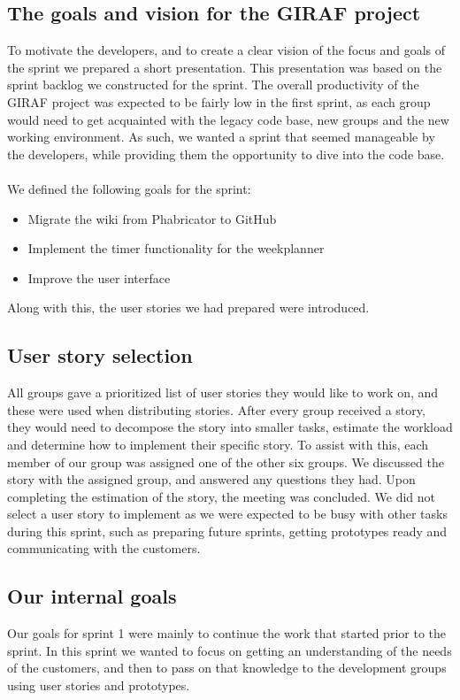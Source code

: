 \subsection{The goals and vision for the GIRAF project}
To motivate the developers, and to create a clear vision of the focus and goals of the sprint we prepared a short presentation.
This presentation was based on the sprint backlog we constructed for the sprint.
The overall productivity of the GIRAF project was expected to be fairly low in the first sprint, as each group would need to get acquainted with the legacy code base, new groups and the new working environment.
As such, we wanted a sprint that seemed manageable by the developers, while providing them the opportunity to dive into the code base.
\\\\
We defined the following goals for the sprint:
\begin{itemize}
    \item Migrate the wiki from Phabricator to GitHub
    \item Implement the timer functionality for the weekplanner
    \item Improve the user interface
\end{itemize}
Along with this, the user stories we had prepared were introduced.

\subsection{User story selection}
All groups gave a prioritized list of user stories they would like to work on, and these were used when distributing stories.
After every group received a story, they would need to decompose the story into smaller tasks, estimate the workload and determine how to implement their specific story.
To assist with this, each member of our group was assigned one of the other six groups.
We discussed the story with the assigned group, and answered any questions they had.
Upon completing the estimation of the story, the meeting was concluded.
We did not select a user story to implement as we were expected to be busy with other tasks during this sprint, such as preparing future sprints, getting prototypes ready and communicating with the customers.

\subsection{Our internal goals}
Our goals for sprint 1 were mainly to continue the work that started prior to the sprint.
In this sprint we wanted to focus on getting an understanding of the needs of the customers, and then to pass on that knowledge to the development groups using user stories and prototypes.

